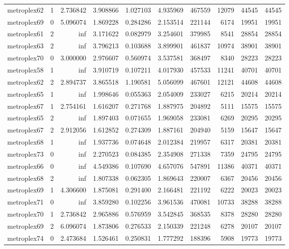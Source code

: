 \begin{longtable}{|l|r|r|r|r|r|r|r|r|r|}
metroplex62 & 1 & 2.736842 & 3.908866 & 1.027103 & 4.935969 & 467559 & 12079 & 44545 & 44545 \\
metroplex69 & 0 & 5.096074 & 1.869228 & 0.284286 & 2.153514 & 221144 & 6174 & 19951 & 19951 \\
metroplex61 & 2 & inf & 3.171622 & 0.082979 & 3.254601 & 379985 & 8541 & 28854 & 28854 \\
metroplex63 & 2 & inf & 3.796213 & 0.103688 & 3.899901 & 461837 & 10974 & 38901 & 38901 \\
metroplex70 & 0 & 3.000000 & 2.976607 & 0.560974 & 3.537581 & 368497 & 8340 & 28223 & 28223 \\
metroplex58 & 1 & inf & 3.910719 & 0.107211 & 4.017930 & 457533 & 11241 & 40701 & 40701 \\
metroplex62 & 2 & 2.894737 & 3.865518 & 1.190581 & 5.056099 & 467601 & 12121 & 44608 & 44608 \\
metroplex65 & 1 & inf & 1.998646 & 0.055363 & 2.054009 & 233027 & 6215 & 20214 & 20214 \\
metroplex67 & 1 & 2.754161 & 1.616207 & 0.271768 & 1.887975 & 204892 & 5111 & 15575 & 15575 \\
metroplex65 & 2 & inf & 1.897403 & 0.071655 & 1.969058 & 233081 & 6269 & 20295 & 20295 \\
metroplex67 & 2 & 2.912056 & 1.612852 & 0.274309 & 1.887161 & 204940 & 5159 & 15647 & 15647 \\
metroplex68 & 1 & inf & 1.937736 & 0.074648 & 2.012384 & 219957 & 6317 & 20381 & 20381 \\
metroplex73 & 0 & inf & 2.270523 & 0.084385 & 2.354908 & 271338 & 7359 & 24795 & 24795 \\
metroplex66 & 0 & inf & 4.549386 & 0.107690 & 4.657076 & 547891 & 11386 & 40371 & 40371 \\
metroplex68 & 2 & inf & 1.807338 & 0.062305 & 1.869643 & 220007 & 6367 & 20456 & 20456 \\
metroplex69 & 1 & 4.306600 & 1.875081 & 0.291400 & 2.166481 & 221192 & 6222 & 20023 & 20023 \\
metroplex71 & 0 & inf & 3.859280 & 0.102256 & 3.961536 & 470081 & 10733 & 38288 & 38288 \\
metroplex70 & 1 & 2.736842 & 2.965886 & 0.576959 & 3.542845 & 368535 & 8378 & 28280 & 28280 \\
metroplex69 & 2 & 6.096074 & 1.873806 & 0.276533 & 2.150339 & 221248 & 6278 & 20107 & 20107 \\
metroplex74 & 0 & 2.473684 & 1.526461 & 0.250831 & 1.777292 & 188396 & 5908 & 19773 & 19773 \\

\end{longtable}
